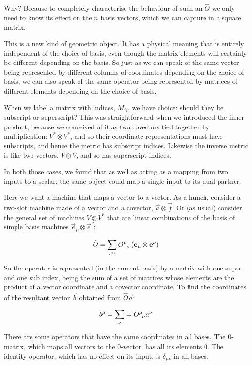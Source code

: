 Why? Because to completely characterise the behaviour of such an $\hat{O}$ we only need to know its effect on the $n$ basis vectors, which we can capture in a square matrix.

This is a new kind of geometric object. It has a physical meaning that is entirely independent of the choice of basis, even though the matrix elements will certainly be different depending on the basis. So just as we can speak of the same vector being represented by different columns of coordinates depending on the choice of basis, we can also speak of the same operator being represented by matrices of different elements depending on the choice of basis.

When we label a matrix with indices, $M_{ij}$, we have choice: should they be subscript or superscript? This was straightforward when we introduced the inner product, because we conceived of it as two covectors tied together by multiplication: $V^* \otimes V^*$, and so their coordinate representations must have subscripts, and hence the metric has subscript indices. Likewise the inverse metric is like two vectors, $V \otimes V$, and so has superscript indices.

In both those cases, we found that as well as acting as a mapping from two inputs to a scalar, the same object could map a single input to its dual partner.

Here we want a machine that maps a vector to a vector. As a hunch, consider a two-slot machine made of a vector and a covector, $\vec{a} \otimes \vec{f}$. Or (as usual) consider the general set of machines $V \otimes V^*$ that are linear combinations of the basis of simple basis machines $\vec{e}_\mu \otimes \vec{e}^\nu$:

\begin{equation}
\hat{O} = \sum_{\mu\nu} O\indices{^\mu_\nu} \left( \vec{e}_\mu \otimes \vec{e}^\nu \right)
\end{equation}

So the operator is represented (in the current basis) by a matrix with one super and one sub index, being the sum of a set of matrices whose elements are the product of a vector coordinate and a covector coordinate. To find the coordinates of the resultant vector $\vec{b}$ obtained from $\hat{O} \vec{a}$:

$$
b^\mu = \sum_{\nu} = O\indices{^\mu_\nu} a^\nu
$$

There are some operators that have the same coordinates in all bases. The $0$-matrix, which maps all vectors to the $0$-vector, has all its elements $0$. The identity operator, which has no effect on its input, is $\delta_{\mu\nu}$ in all bases.

